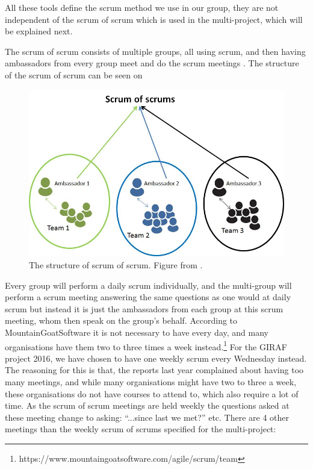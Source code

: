 All these tools define the scrum method we use in our group, they are not independent of the scrum of scrum which is used in the multi-project, which will be explained next.

The scrum of scrum consists of multiple groups, all using scrum, and then having ambassadors from every group meet and do the scrum meetings \cite{SCRUMBOOK}.
The structure of the scrum of scrum can be seen on 

\begin{figure}
\centering
\includegraphics[scale=0.4]{figures/scrumofscrum.png}
\caption{The structure of scrum of scrum. Figure from \cite{scrumofscrumfigure}.}
\label{fig:scrumofscrum}
\end{figure}

Every group will perform a daily scrum individually, and the multi-group will perform a scrum meeting answering the same questions as one would at daily scrum but instead it is just the ambassadors from each group at this scrum meeting, whom then speak on the group's behalf.
According to MountainGoatSoftware it is not necessary to have every day, and many organisations have them two to three times a week instead.\footnote{https://www.mountaingoatsoftware.com/agile/scrum/team}
For the GIRAF project 2016, we have chosen to have one weekly scrum every Wednesday instead.
The reasoning for this is that, the reports last year complained about having too many meetings, and while many organisations might have two to three a week, these organisations do not have courses to attend to, which also require a lot of time.
As the scrum of scrum meetings are held weekly the questions asked at these meeting change to asking: ``...since last we met?'' etc.
There are 4 other meetings than the weekly scrum of scrums specified for the multi-project:

